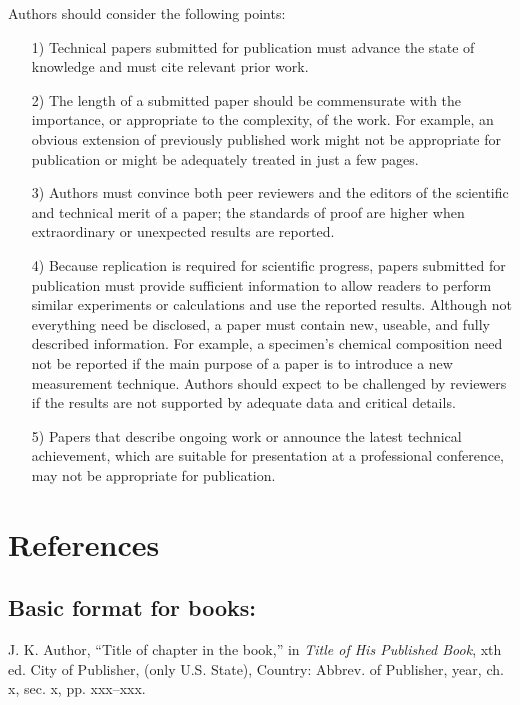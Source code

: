 \documentclass[journal]{IEEEtai}
\begin{document}
Authors should consider the following points:
\begin{enumerate}
\item[1)]Technical papers submitted for publication must advance the state of knowledge and must cite relevant prior work. 

\item[2)]The length of a submitted paper should be commensurate with the importance, or appropriate to the complexity, of the work. For example, an obvious extension of previously published work might not be appropriate for publication or might be adequately treated in just a few pages.

\item[3)]Authors must convince both peer reviewers and the editors of the scientific and technical merit of a paper; the standards of proof are higher when extraordinary or unexpected results are reported. 

\item[4)]Because replication is required for scientific progress, papers submitted for publication must provide sufficient information to allow readers to perform similar experiments or calculations and use the reported results. Although not everything need be disclosed, a paper must contain new, useable, and fully described information. For example, a specimen's chemical composition need not be reported if the main purpose of a paper is to introduce a new measurement technique. Authors should expect to be challenged by reviewers if the results are not supported by adequate data and critical details.

\item[5)]Papers that describe ongoing work or announce the latest technical achievement, which are suitable for presentation at a professional conference, may not be appropriate for publication.
\end{enumerate}

\section*{References}

\subsection*{Basic format for books:}\vspace*{-12pt}
\def\refname{}
\begin{thebibliography}{34}
\item[] J. K. Author, ``Title of chapter in the book,'' in {\em Title of His Published Book}, xth ed. City of Publisher, (only U.S. State), Country: Abbrev. of Publisher, year, ch. x, sec. x, pp. xxx--xxx.
\end{thebibliography}
\end{document}
